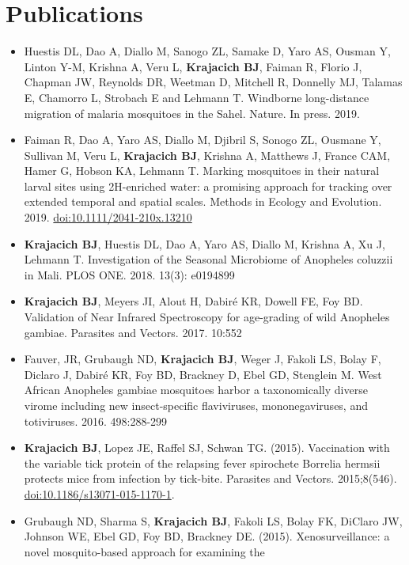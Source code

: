 \documentclass[11pt, a4paper]{awesome-cv}
\begin{document}
\hypertarget{publications}{%
\section{Publications}\label{publications}}

\begin{itemize}
\item
  Huestis DL, Dao A, Diallo M, Sanogo ZL, Samake D, Yaro AS, Ousman Y,
  Linton Y-M, Krishna A, Veru L, \textbf{Krajacich BJ}, Faiman R, Florio
  J, Chapman JW, Reynolds DR, Weetman D, Mitchell R, Donnelly MJ,
  Talamas E, Chamorro L, Strobach E and Lehmann T. Windborne
  long-distance migration of malaria mosquitoes in the Sahel. Nature. In
  press. 2019.
\item
  Faiman R, Dao A, Yaro AS, Diallo M, Djibril S, Sonogo ZL, Ousmane Y,
  Sullivan M, Veru L, \textbf{Krajacich BJ}, Krishna A, Matthews J,
  France CAM, Hamer G, Hobson KA, Lehmann T. Marking mosquitoes in their
  natural larval sites using 2H-enriched water: a promising approach for
  tracking over extended temporal and spatial scales. Methods in Ecology
  and Evolution. 2019. \url{doi:10.1111/2041-210x.13210}
\item
  \textbf{Krajacich BJ}, Huestis DL, Dao A, Yaro AS, Diallo M, Krishna
  A, Xu J, Lehmann T. Investigation of the Seasonal Microbiome of
  Anopheles coluzzii in Mali. PLOS ONE. 2018. 13(3): e0194899
\item
  \textbf{Krajacich BJ}, Meyers JI, Alout H, Dabiré KR, Dowell FE, Foy
  BD. Validation of Near Infrared Spectroscopy for age-grading of wild
  Anopheles gambiae. Parasites and Vectors. 2017. 10:552
\item
  Fauver, JR, Grubaugh ND, \textbf{Krajacich BJ}, Weger J, Fakoli LS,
  Bolay F, Diclaro J, Dabiré KR, Foy BD, Brackney D, Ebel GD, Stenglein
  M. West African Anopheles gambiae mosquitoes harbor a taxonomically
  diverse virome including new insect-specific flaviviruses,
  mononegaviruses, and totiviruses. 2016. 498:288-299
\item
  \textbf{Krajacich BJ}, Lopez JE, Raffel SJ, Schwan TG. (2015).
  Vaccination with the variable tick protein of the relapsing fever
  spirochete Borrelia hermsii protects mice from infection by tick-bite.
  Parasites and Vectors. 2015;8(546).
  \url{doi:10.1186/s13071-015-1170-1}.
\item
  Grubaugh ND, Sharma S, \textbf{Krajacich BJ}, Fakoli LS, Bolay FK,
  DiClaro JW, Johnson WE, Ebel GD, Foy BD, Brackney DE. (2015).
  Xenosurveillance: a novel mosquito-based approach for examining the

\end{itemize}
\end{document}
